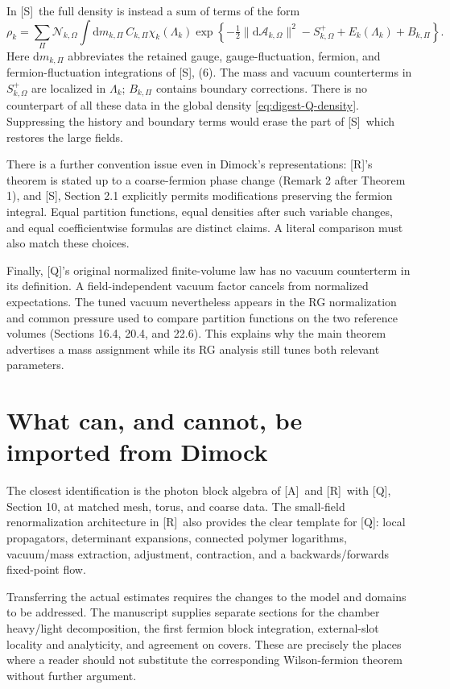 \documentclass[11pt]{article}
\numberwithin{equation}{section}
\newcommand{\dd}{\mathrm d}
\newcommand{\Q}{\textup{[Q]}}
\newcommand{\AG}{\textup{[A]}}
\newcommand{\UR}{\textup{[R]}}
\newcommand{\US}{\textup{[S]}}
\begin{document}
In \US\ the full density is instead a sum of terms of the form
\begin{equation}
 \rho_k
 =\sum_\Pi\mathcal N_{k,\Omega}\int\dd m_{k,\Pi}\,
 C_{k,\Pi}\chi_k(\Lambda_k)
 \exp\left\{-\tfrac12\|\dd\mathcal A_{k,\Omega}\|^2
             -S^+_{k,\Omega}+E_k(\Lambda_k)+B_{k,\Pi}\right\}.
 \label{eq:digest-history-density}
\end{equation}
Here $\dd m_{k,\Pi}$ abbreviates the retained gauge, gauge-fluctuation,
fermion, and fermion-fluctuation integrations of \US, (6).
The mass and vacuum counterterms in $S^+_{k,\Omega}$ are localized
in $\Lambda_k$; $B_{k,\Pi}$ contains boundary corrections.
There is no counterpart of all these data in the global density
\eqref{eq:digest-Q-density}. Suppressing the history and boundary
terms would erase the part of \US\ which restores the large fields.

There is a further convention issue even in Dimock's representations:
\UR's theorem is stated up to a coarse-fermion phase change
(Remark 2 after Theorem 1), and \US, Section 2.1 explicitly permits
modifications preserving the fermion integral. Equal partition
functions, equal densities after such variable changes, and equal
coefficientwise formulas are distinct claims. A literal comparison
must also match these choices.

Finally, \Q's original normalized finite-volume law has no vacuum
counterterm in its definition. A field-independent vacuum factor
cancels from normalized expectations. The tuned vacuum nevertheless
appears in the RG normalization and common pressure used to compare
partition functions on the two reference volumes (Sections 16.4,
20.4, and 22.6). This explains why the main theorem advertises a mass
assignment while its RG analysis still tunes both relevant parameters.

\section{What can, and cannot, be imported from Dimock}

The closest identification is the photon block algebra of \AG\ and
\UR\ with \Q, Section 10, at matched mesh, torus, and coarse data.
The small-field renormalization architecture in \UR\ also provides
the clear template for \Q: local propagators, determinant expansions,
connected polymer logarithms, vacuum/mass extraction, adjustment,
contraction, and a backwards/forwards fixed-point flow.

Transferring the actual estimates requires the changes to the model
and domains to be addressed. The manuscript supplies separate
sections for the chamber heavy/light decomposition, the first
fermion block integration, external-slot locality and analyticity,
and agreement on covers. These are precisely the places where a
reader should not substitute the corresponding Wilson-fermion
theorem without further argument.
\end{document}
